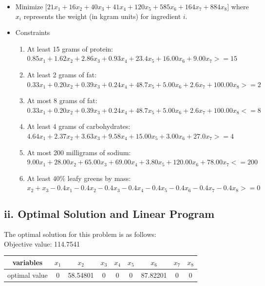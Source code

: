 \documentclass[11pt]{scrreprt}
\begin{document}
\begin{itemize}
	\item Minimize
[$21x_{1}+16x_{2}+40x_{3}+41x_{4}+120x_{5}+585x_{6}+164x_{7}+884x_{8}$]
where $x_{i}$ represents the weight (in kgram units) for ingredient $i$.
	\item Constraints
	\begin{enumerate}
		\item At least 15 grams of protein:\\
		$0.85x_{1}+1.62x_{2}+2.86x_{3}+0.93x_{4}+23.4x_{5}+16.00x_{6}+9.00x_{7} >= 15$
		\item At least 2 grams of fat:\\
		$0.33x_{1}+0.20x_{2}+0.39x_{3}+0.24x_{4}+48.7x_{5}+5.00x_{6}+2.6x_{7}+100.00x_{8} >= 2$
		\item At most 8 grams of fat:\\
		$0.33x_{1}+0.20x_{2}+0.39x_{3}+0.24x_{4}+48.7x_{5}+5.00x_{6}+2.6x_{7}+100.00x_{8} <= 8$
		\item At least 4 grams of carbohydrates:\\
		$4.64x_{1}+2.37x_{2}+3.63x_{3}+9.58x_{4}+15.00x_{5}+3.00x_{6}+27.0x_{7} >= 4$
		\item At most 200 milligrams of sodium:\\
		$9.00x_{1}+28.00x_{2}+65.00x_{3}+69.00x_{4}+3.80x_{5}+120.00x_{6}+78.00x_{7} <= 200$
		\item At least 40\% leafy greens by mass:\\
		$x_{2}+x_{3}-0.4x_{1}-0.4x_{2}-0.4x_{3}-0.4x_{4}-0.4x_{5}-0.4x_{6}-0.4x_{7}-0.4x_{8} >= 0$
	\end{enumerate}
\end{itemize}

\subsection{ii. Optimal Solution and Linear Program}
The optimal solution for this problem is as follows:\\

Objective value: 114.7541\\

\begin{tabular}{|c|c|c|c|c|c|c|c|c|}
	\hline variables & $x_{1}$ & $x_{2}$ & $x_{3}$ & $x_{4}$ & $x_{5}$ & $x_{6}$ & $x_{7}$ & $x_{8}$ \\
	\hline optimal value & 0 & 58.54801 & 0 & 0 & 0 & 87.82201 & 0 & 0 \\
	\hline
\end{tabular} \\
\end{document}
